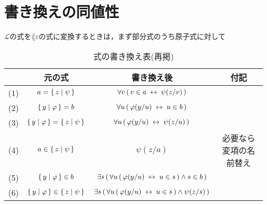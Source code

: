 \section{書き換えの同値性}
\label{sec:equivalence_of_formula_rewriting}
	$\mathcal{L}$の式を$\lang{\varepsilon}$の式に変換するときは，まず部分式のうち原子式に対して
	\begin{table}[H]
		\begin{center}
		\caption{式の書き換え表(再掲)}
		\begin{tabular}{c|c|c|c}
			 & 元の式 & 書き換え後 & 付記 \\ \hline \hline
			(1) & $a = \{\, z \mid \psi\, \}$ & $\forall v\, (\, v \in a \hspace{0.25em}\leftrightarrow\hspace{0.25em} \psi(z/v)\, )$ & \\ \hline
			(2) & $\{\, y \mid \varphi\, \} = b$ & $\forall u\, (\, \varphi(y/u) \hspace{0.25em}\leftrightarrow\hspace{0.25em} u \in b\, )$ & \\ \hline
			(3) & $\{\, y \mid \varphi\, \} = \{\, z \mid \psi\, \}$ & $\forall u\, (\, \varphi(y/u) \hspace{0.25em}\leftrightarrow\hspace{0.25em} \psi(z/u)\, )$ & \\ \hline
			(4) & $a \in \{\, z \mid \psi\, \}$ & $\psi(z/a)$ & 必要なら変項の名前替え \\ \hline
			(5) & $\{\, y \mid \varphi\, \} \in b$ & $\exists s\, (\, \forall u\, (\, \varphi(y/u) \hspace{0.25em}\leftrightarrow\hspace{0.25em} u \in s\, ) \wedge s \in b\, )$ & \\ \hline
			(6) & $\{\, y \mid \varphi\, \} \in \{\, z \mid \psi\, \}$ & $\exists s\, (\, \forall u\, (\, \varphi(y/u) \hspace{0.25em}\leftrightarrow\hspace{0.25em} u \in s\, ) \wedge \psi(z/s)\, )$ & \\ \hline
		\end{tabular}
		\label{tab:formula_rewriting_repeat}
		\end{center}
	\end{table}
	
